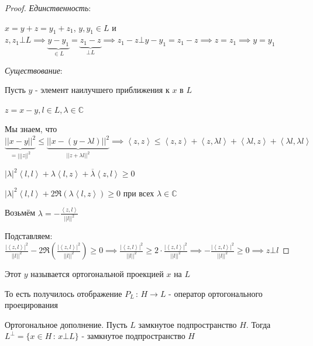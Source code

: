 \begin{proof}
    \textit{Единственность}:

    $x = y + z = y_1 + z_1$, $y, y_1 \in L$ и $z, z_1 \bot L \implies \underbrace{y - y_1}_{\in L} = \underbrace{z_1 - z}_{\bot L} \implies z_1 - z \bot y - y_1 = z_1 - z \implies z = z_1 \implies y = y_1$

    \textit{Существование}:

    Пусть $y$ - элемент наилучшего приближения к $x$ в $L$

    $z = x - y, l \in L, \lambda \in \mathbb{C}$

    Мы знаем, что $\underbrace{|| x - y ||^2}_{= |||z||^2} \leqslant \underbrace{|| x - (y - \lambda l) ||^2}_{||z + \lambda l||^2} \implies \left < z, z \right > \leqslant \left < z, z \right > + \left < z, \lambda l \right > + \left < \lambda l, z \right > + \left < \lambda l, \lambda l \right >$

    $|\lambda|^2 \left < l, l \right > + \lambda \left < l, z \right > + \overline{\lambda} \left < z, l \right > \geqslant 0$

    $|\lambda|^2 \left < l, l \right > + 2 \Re (\lambda \left < l, z \right >) \geqslant 0$ при всех $\lambda \in \mathbb{C}$

    Возьмём $\lambda = -\frac{\left < z, l \right >}{||l||^2}$

    Подставляем: $\frac{|\left < z, l \right >|^2}{||l||^2} - 2\Re \left( \frac{|\left < z, l \right >|^2}{||l||^2} \right) \geq 0 \implies \frac{|\left < z, l \right >|^2}{||l||^2} \geq 2 \cdot \frac{|\left < z, l \right >|^2}{||l||^2} \implies - \frac{|\left <z, l \right >|^2}{||l||^2} \geq 0 \implies z \bot l$
\end{proof}

\begin{definition}
    Этот $y$ называется ортогональной проекцией $x$ на $L$

    То есть получилось отображение $P_L \, : \, H \to L$ - оператор ортогонального проецирования
\end{definition}

\begin{definition}
    Ортогональное дополнение. Пусть $L$ замкнутое подпространство $H$. Тогда $L^\bot = \{ x \in H \, : \, x \bot L \}$ - замкнутое подпространство $H$
\end{definition}

